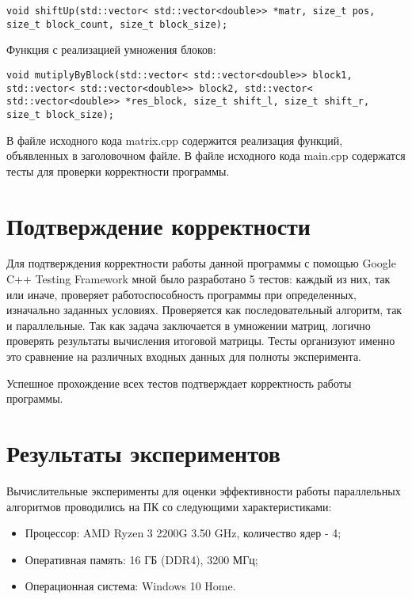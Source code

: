 \documentclass{report}
\begin{document}
\begin{lstlisting}
void shiftUp(std::vector< std::vector<double>> *matr, size_t pos, size_t block_count, size_t block_size);
\end{lstlisting}
\par Функция с реализацией умножения блоков:
\begin{lstlisting}
void mutiplyByBlock(std::vector< std::vector<double>> block1, std::vector< std::vector<double>> block2, std::vector< std::vector<double>> *res_block, size_t shift_l, size_t shift_r, size_t block_size);
\end{lstlisting}
\par В файле исходного кода matrix.cpp содержится реализация функций, объявленных в заголовочном файле. В файле исходного кода main.cpp содержатся тесты для проверки корректности программы.
\newpage

\section*{Подтверждение корректности}
Для подтверждения корректности работы данной программы с помощью Google C++ Testing Framework мной было разработано 5 тестов: каждый из них, так или иначе, проверяет работоспособность программы при определенных, изначально заданных условиях. Проверяется как последовательный алгоритм, так и параллельные. Так как задача заключается в умножении матриц, логично проверять результаты вычисления итоговой матрицы. Тесты организуют именно это сравнение на различных входных данных для полноты эксперимента.

\par Успешное прохождение всех тестов подтверждает корректность работы программы.
\newpage

\section*{Результаты экспериментов}
Вычислительные эксперименты для оценки эффективности работы параллельных алгоритмов проводились на ПК со следующими характеристиками:
\begin{itemize}
\item Процессор: AMD Ryzen 3 2200G 3.50 GHz, количество ядер - 4;
\item Оперативная память: 16 ГБ (DDR4), 3200 МГц;
\item Операционная система: Windows 10 Home.
\end{itemize}
\end{document}
